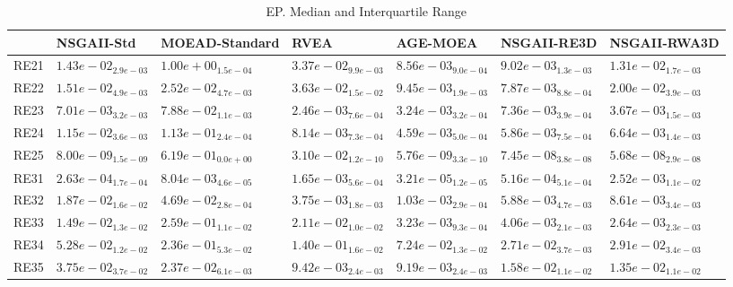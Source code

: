 \documentclass{article}
\begin{document}
\begin{table}
\caption{EP. Median and Interquartile Range}
\label{table: EP}
\centering
\begin{scriptsize}
\begin{tabular}{lllllll}
\hline & NSGAII-Std & MOEAD-Standard & RVEA & AGE-MOEA & NSGAII-RE3D &  NSGAII-RWA3D\\
\hline 
RE21 & $  1.43e-02_{ 2.9e-03}$ & $  1.00e+00_{ 1.5e-04}$ & $  3.37e-02_{ 9.9e-03}$ & \cellcolor{gray95}$  8.56e-03_{ 9.0e-04}$ & \cellcolor{gray25}$  9.02e-03_{ 1.3e-03}$ & $  1.31e-02_{ 1.7e-03}$ \\
RE22 & $  1.51e-02_{ 4.9e-03}$ & $  2.52e-02_{ 4.7e-03}$ & $  3.63e-02_{ 1.5e-02}$ & \cellcolor{gray25}$  9.45e-03_{ 1.9e-03}$ & \cellcolor{gray95}$  7.87e-03_{ 8.8e-04}$ & $  2.00e-02_{ 3.9e-03}$ \\
RE23 & $  7.01e-03_{ 3.2e-03}$ & $  7.88e-02_{ 1.1e-03}$ & \cellcolor{gray95}$  2.46e-03_{ 7.6e-04}$ & \cellcolor{gray25}$  3.24e-03_{ 3.2e-04}$ & $  7.36e-03_{ 3.9e-04}$ & $  3.67e-03_{ 1.5e-03}$ \\
RE24 & $  1.15e-02_{ 3.6e-03}$ & $  1.13e-01_{ 2.4e-04}$ & $  8.14e-03_{ 7.3e-04}$ & \cellcolor{gray95}$  4.59e-03_{ 5.0e-04}$ & \cellcolor{gray25}$  5.86e-03_{ 7.5e-04}$ & $  6.64e-03_{ 1.4e-03}$ \\
RE25 & \cellcolor{gray25}$  8.00e-09_{ 1.5e-09}$ & $  6.19e-01_{ 0.0e+00}$ & $  3.10e-02_{ 1.2e-10}$ & \cellcolor{gray95}$  5.76e-09_{ 3.3e-10}$ & $  7.45e-08_{ 3.8e-08}$ & $  5.68e-08_{ 2.9e-08}$ \\
RE31 & \cellcolor{gray25}$  2.63e-04_{ 1.7e-04}$ & $  8.04e-03_{ 4.6e-05}$ & $  1.65e-03_{ 5.6e-04}$ & \cellcolor{gray95}$  3.21e-05_{ 1.2e-05}$ & $  5.16e-04_{ 5.1e-04}$ & $  2.52e-03_{ 1.1e-02}$ \\
RE32 & $  1.87e-02_{ 1.6e-02}$ & $  4.69e-02_{ 2.8e-04}$ & \cellcolor{gray25}$  3.75e-03_{ 1.8e-03}$ & \cellcolor{gray95}$  1.03e-03_{ 2.9e-04}$ & $  5.88e-03_{ 4.7e-03}$ & $  8.61e-03_{ 3.4e-03}$ \\
RE33 & $  1.49e-02_{ 1.3e-02}$ & $  2.59e-01_{ 1.1e-02}$ & $  2.11e-02_{ 1.0e-02}$ & \cellcolor{gray25}$  3.23e-03_{ 9.3e-04}$ & $  4.06e-03_{ 2.1e-03}$ & \cellcolor{gray95}$  2.64e-03_{ 2.3e-03}$ \\
RE34 & $  5.28e-02_{ 1.2e-02}$ & $  2.36e-01_{ 5.3e-02}$ & $  1.40e-01_{ 1.6e-02}$ & $  7.24e-02_{ 1.3e-02}$ & \cellcolor{gray95}$  2.71e-02_{ 3.7e-03}$ & \cellcolor{gray25}$  2.91e-02_{ 3.4e-03}$ \\
RE35 & $  3.75e-02_{ 3.7e-02}$ & $  2.37e-02_{ 6.1e-03}$ & \cellcolor{gray25}$  9.42e-03_{ 2.4e-03}$ & \cellcolor{gray95}$  9.19e-03_{ 2.4e-03}$ & $  1.58e-02_{ 1.1e-02}$ & $  1.35e-02_{ 1.1e-02}$ \\

\end{tabular}
\end{scriptsize}
\end{table}
\end{document}
